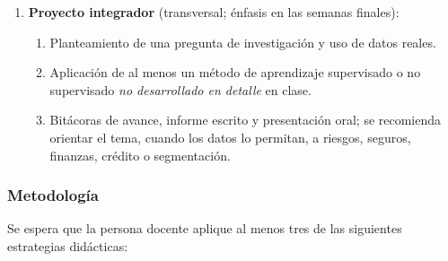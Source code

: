 \begin{refsection}
\begin{enumerate}
\begin{enumerate}
\item Motivación del aprendizaje supervisado.
\item Método de $k$ vecinos más cercanos (KNN) (\emph{ampliación} o puente hacia evaluación de clasificadores).
\item \textbf{Medición de la calidad de un método supervisado:}
\begin{enumerate}
\item Matriz de confusión.
\item Análisis del error y curvas ROC.
\end{enumerate}
\item \textbf{Análisis discriminante:}
\begin{enumerate}
\item Enfoque factorial.
\item Enfoque bayesiano / métodos bayesianos asociados.
\end{enumerate}
\item Árboles de decisión (método CART).
\item Bosques aleatorios.
\item Valores de Shapley para explicar la predicción de los modelos.
\item Máquinas de soporte vectorial.
\item Validación cruzada y calibración de modelos.
\end{enumerate}
\item \textbf{Proyecto integrador} (transversal; énfasis en las semanas finales):
\begin{enumerate}
\item Planteamiento de una pregunta de investigación y uso de datos reales.
\item Aplicación de al menos un método de aprendizaje supervisado o no supervisado \emph{no desarrollado en detalle} en clase.
\item Bitácoras de avance, informe escrito y presentación oral; se recomienda orientar el tema, cuando los datos lo permitan, a riesgos, seguros, finanzas, crédito o segmentación.
\end{enumerate}
\end{enumerate}

\subsubsection*{Metodología}

Se espera que la persona docente aplique al menos tres de las siguientes estrategias didácticas:


\end{refsection}
